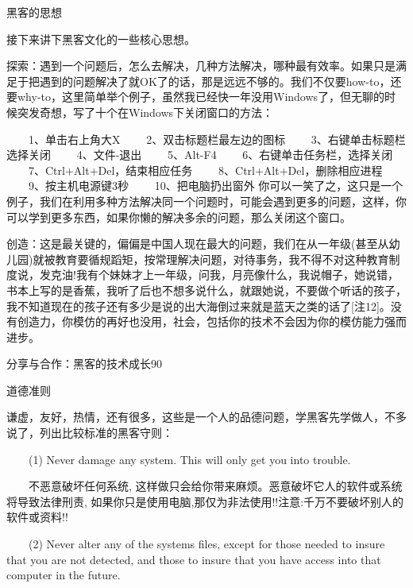 \documentclass[12pt,a4paper]{article}
\begin{document}
\begin{CJK}{UTF8}{gbsn}
\begin{LARGE}
黑客的思想
\end{LARGE}

接下来讲下黑客文化的一些核心思想。

探索：遇到一个问题后，怎么去解决，几种方法解决，哪种最有效率。如果只是满足于把遇到的问题解决了就OK了的话，那是远远不够的。我们不仅要how-to，还要why-to，这里简单举个例子，虽然我已经快一年没用Windows了，但无聊的时候突发奇想，写了十个在Windows下关闭窗口的方法：

　　1、单击右上角大X
　　2、双击标题栏最左边的图标
　　3、右键单击标题栏选择关闭
　　4、文件-退出
　　5、Alt-F4
　　6、右键单击任务栏，选择关闭
　　7、Ctrl+Alt+Del，结束相应任务
　　8、Ctrl+Alt+Del，删除相应进程
　　9、按主机电源键3秒
　　10、把电脑扔出窗外
你可以一笑了之，这只是一个例子，我们在利用多种方法解决同一个问题时，可能会遇到更多的问题，这样，你可以学到更多东西，如果你懒的解决多余的问题，那么关闭这个窗口。

创造：这是最关键的，偏偏是中国人现在最大的问题，我们在从一年级(甚至从幼儿园)就被教育要循规蹈矩，按常理解决问题，对待事务，我不得不对这种教育制度说，发克油!我有个妹妹才上一年级，问我，月亮像什么，我说帽子，她说错，书本上写的是香蕉，我听了后也不想多说什么，就跟她说，不要做个听话的孩子，我不知道现在的孩子还有多少是说的出大海倒过来就是蓝天之类的话了[注12]。没有创造力，你模仿的再好也没用，社会，包括你的技术不会因为你的模仿能力强而进步。

分享与合作：黑客的技术成长90%


\begin{LARGE}
道德准则
\end{LARGE}


谦虚，友好，热情，还有很多，这些是一个人的品德问题，学黑客先学做人，不多说了，列出比较标准的黑客守则：

　　(1) Never damage any system. This will only get you into trouble.

　　不恶意破坏任何系统, 这样做只会给你带来麻烦。恶意破坏它人的软件或系统将导致法律刑责, 如果你只是使用电脑,那仅为非法使用!!注意:千万不要破坏别人的软件或资料!!

　　(2) Never alter any of the systems files, except for those needed to insure that you are not detected, and those to insure that you have access into that computer in the future.


\end{CJK}
\end{document}
